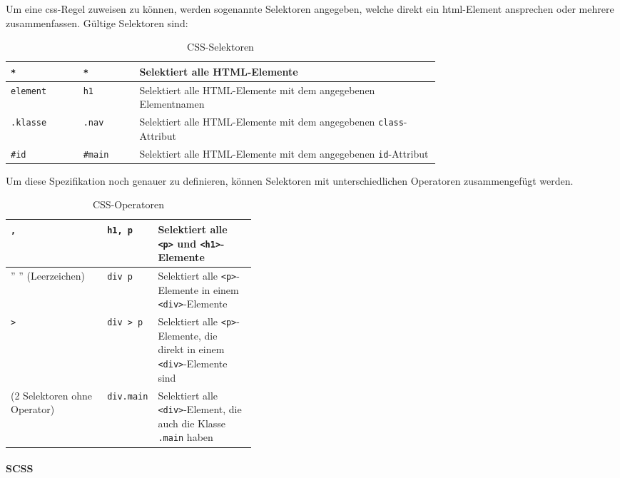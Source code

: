 Um eine \gls{css}-Regel zuweisen zu können, werden sogenannte Selektoren angegeben, welche direkt ein \gls{html}-Element ansprechen oder mehrere zusammenfassen. Gültige Selektoren sind:

\begin{table}[H]
    \centering
    \begin{tabular}{|l|l|p{0.7\linewidth}|}
        \hline
        \lstinline|*| & \lstinline|*| & Selektiert alle HTML-Elemente                                                      \\ \hline
        \lstinline|element| & \lstinline|h1| & Selektiert alle HTML-Elemente mit dem angegebenen Elementnamen                     \\ \hline
        \lstinline|.klasse| & \lstinline|.nav| & Selektiert alle HTML-Elemente mit dem angegebenen \lstinline|class|-Attribut \\ \hline
        \lstinline|#id| & \lstinline|#main| & Selektiert alle HTML-Elemente mit dem angegebenen \lstinline|id|-Attribut \\ \hline
    \end{tabular}
    \caption{CSS-Selektoren}
\end{table}

Um diese Spezifikation noch genauer zu definieren, können Selektoren mit unterschiedlichen Operatoren zusammengefügt werden.

\begin{table}[H]
    \centering
    \begin{tabular}{|l|l|p{0.4\linewidth}|}
        \hline
        \lstinline|,|      & \lstinline|h1, p| & Selektiert alle \lstinline|<p>| und \lstinline|<h1>|-Elemente                                \\ \hline
        '' '' (Leerzeichen)          & \lstinline|div p| & Selektiert alle \lstinline|<p>|-Elemente in einem \lstinline|<div>|-Elemente                  \\ \hline
        \lstinline|>|      & \lstinline|div > p| & Selektiert alle \lstinline|<p>|-Elemente, die direkt in einem \lstinline|<div>|-Elemente sind \\ \hline
        (2 Selektoren ohne Operator) & \lstinline|div.main| & Selektiert alle \lstinline|<div>|-Element, die auch die Klasse \lstinline|.main| haben          \\ \hline
    \end{tabular}
    \caption{CSS-Operatoren}
\end{table}

\paragraph{SCSS}


